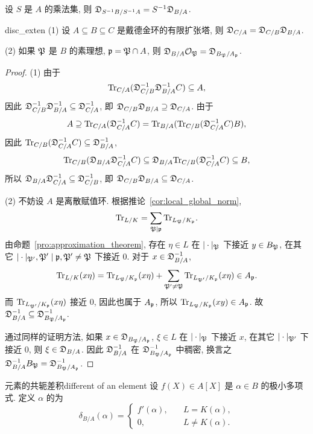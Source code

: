 \begin{exercise}
设 $S$ 是 $A$ 的乘法集, 则 $\fD_{S^{-1}B/S^{-1}A}=S^{-1}\fD_{B/A}$.
\end{exercise}

\begin{proposition}{}{disc_exten}
(1) 设 $A\subseteq B\subseteq C$ 是戴德金环的有限扩张塔, 则 $\fD_{C/A}=\fD_{C/B}\fD_{B/A}$.

(2) 如果 $\fP$ 是 $B$ 的素理想, $\fp=\fP\cap A$, 则 $\fD_{B/A}\CO_\fP=\fD_{B_\fP/A_\fp}$.
\end{proposition}
\begin{proof}
(1) 由于
  \[\Tr_{C/A}(\fD_{C/B}^{-1}\fD_{B/A}^{-1}C)\subseteq A,\]
因此 $\fD_{C/B}^{-1}\fD_{B/A}^{-1}\subseteq \fD_{C/A}^{-1}$, 即 $\fD_{C/B}\fD_{B/A}\supseteq \fD_{C/A}$.
由于
  \[A\supseteq \Tr_{C/A}(\fD_{C/A}^{-1} C)=\Tr_{B/A}(\Tr_{C/B}(\fD_{C/A}^{-1} C)B),\]
因此 $\Tr_{C/B}(\fD_{C/A}^{-1} C)\subseteq \fD^{-1}_{B/A}$,
  \[\Tr_{C/B}(\fD_{B/A} \fD_{C/A}^{-1} C)\subseteq\fD_{B/A} \Tr_{C/B}(\fD_{C/A}^{-1} C)\subseteq B,\]
所以 $\fD_{B/A} \fD_{C/A}^{-1}\subseteq \fD_{C/B}^{-1}$, 即 $\fD_{C/B}\fD_{B/A}\subseteq \fD_{C/A}$.

(2) 不妨设 $A$ 是离散赋值环. 根据推论~\ref{cor:local_global_norm},
  \[\Tr_{L/K}=\sum_{\fP\mid\fp} \Tr_{L_\fP/K_\fp}.\]
由命题~\ref{pro:approximation_theorem}, 存在 $\eta\in L$ 在 $|\cdot|_\fP$ 下接近 $y\in B_\fP$, 在其它 $|\cdot|_{\fP'},\fP'\mid \fp,\fP'\neq\fP$ 下接近 $0$. 对于 $x\in\fD^{-1}_{B/A}$,
  \[\Tr_{L/K}(x\eta)=\Tr_{L_\fP/K_\fp}(x\eta)+\sum_{\fP'\neq\fP}\Tr_{L_{\fP'}/K_\fp}(x\eta)\in A_\fp.\]
而 $\Tr_{L_{\fP'}/K_\fp}(x\eta)$ 接近 $0$, 因此也属于 $A_\fp$, 所以 $\Tr_{L_{\fP}/K_\fp}(x y)\in A_\fp$. 故 $\fD^{-1}_{B/A}\subseteq \fD^{-1}_{B_\fP/A_\fp}.$

通过同样的证明方法, 如果 $x\in\fD_{B_\fP/A_\fp}$, $\xi\in L$ 在 $|\cdot|_\fP$ 下接近 $x$, 在其它 $|\cdot|_{\fP'}$ 下接近 $0$, 则 $\xi\in \fD_{B/A}$. 因此 $\fD^{-1}_{B/A}$ 在 $\fD^{-1}_{B_\fP/A_\fp}$ 中稠密, 换言之 $\fD^{-1}_{B/A}B_\fP=\fD^{-1}_{B_\fP/A_\fp}$.
\end{proof}

\begin{definition}{元素的共轭差积}{different of an element}
设 $f(X)\in A[X]$ 是 $\alpha\in B$ 的极小多项式. 定义 $\alpha$ 的为
  \[\delta_{B/A}(\alpha)=\begin{cases}
f'(\alpha),\quad &L=K(\alpha),\\
0,& L\neq K(\alpha).
\end{cases}\]
\end{definition}

